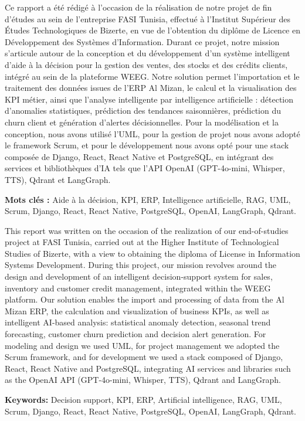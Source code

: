 \documentclass[a4paper,12pt]{report}
\newenvironment{Resumé}{%
    \par\smallskip
    \noindent{\normalsize\bfseries Résumé}\par\smallskip
    \small
}{%
    \par\smallskip
    \normalsize
}
\newenvironment{Abstract}{%
    \par\smallskip
    \noindent{\normalsize\bfseries Abstract}\par\smallskip
    \small
}{%
    \par\smallskip
    \normalsize
}
\begin{document}
\begin{Resumé}
Ce rapport a été rédigé à l'occasion de la réalisation de
notre projet de fin d'études au sein de l'entreprise FASI Tunisia, effectué à
l'Institut Supérieur des Études Technologiques de Bizerte, en vue de l'obtention
du diplôme de Licence en Développement des Systèmes d'Information. Durant ce
projet, notre mission s'articule autour de la conception et du développement d'un
système intelligent d'aide à la décision pour la gestion des ventes, des stocks
et des crédits clients, intégré au sein de la plateforme WEEG. Notre solution
permet l'importation et le traitement des données issues de l'ERP Al Mizan, le
calcul et la visualisation des KPI métier, ainsi que l'analyse intelligente par
intelligence artificielle : détection d'anomalies statistiques, prédiction des
tendances saisonnières, prédiction du churn client et génération d'alertes
décisionnelles. Pour la modélisation et la conception, nous avons utilisé l'UML,
pour la gestion de projet nous avons adopté le framework Scrum, et pour le
développement nous avons opté pour une stack composée de Django, React, React
Native et PostgreSQL, en intégrant des services et bibliothèques d'IA tels que
l'API OpenAI (GPT-4o-mini, Whisper, TTS), Qdrant et LangGraph.

\textbf{Mots clés :} Aide à la décision, KPI, ERP, Intelligence artificielle,
RAG, UML, Scrum, Django, React, React Native, PostgreSQL, OpenAI, LangGraph,
Qdrant.
\end{Resumé}


\begin{Abstract}
This report was written on the occasion of the realization of
our end-of-studies project at FASI Tunisia, carried out at the Higher Institute
of Technological Studies of Bizerte, with a view to obtaining the diploma of
License in Information Systems Development. During this project, our mission
revolves around the design and development of an intelligent decision-support
system for sales, inventory and customer credit management, integrated within the
WEEG platform. Our solution enables the import and processing of data from the
Al Mizan ERP, the calculation and visualization of business KPIs, as well as
intelligent AI-based analysis: statistical anomaly detection, seasonal trend
forecasting, customer churn prediction and decision alert generation. For
modeling and design we used UML, for project management we adopted the Scrum
framework, and for development we used a stack composed of Django, React, React
Native and PostgreSQL, integrating AI services and libraries such as the OpenAI
API (GPT-4o-mini, Whisper, TTS), Qdrant and LangGraph.

\textbf{Keywords:} Decision support, KPI, ERP, Artificial intelligence, RAG,
UML, Scrum, Django, React, React Native, PostgreSQL, OpenAI, LangGraph, Qdrant.
\end{Abstract}
\end{document}
